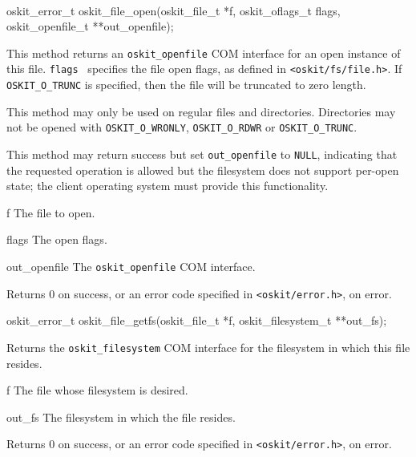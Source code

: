 \label{fs-file-open}
\begin{apisyn}
	\\

	\funcproto oskit_error_t
	oskit_file_open(oskit_file_t *f, 
	               oskit_oflags_t flags,
		       \outparam oskit_openfile_t **out_openfile);
\end{apisyn}
\ostofs
\begin{apidesc}
	This method returns an {\tt oskit_openfile} COM interface
	for an open instance of this file.
	{\tt flags } specifies the file open flags, as
	defined in {\tt <oskit/fs/file.h>}.  If {\tt OSKIT_O_TRUNC}
	is specified, then the file will be truncated
	to zero length. 

	This method may only be used on regular 	
	files and directories.   Directories
	may not be opened with {\tt OSKIT_O_WRONLY},
	{\tt OSKIT_O_RDWR} or {\tt OSKIT_O_TRUNC}.

	This method may return success but set
	{\tt *out_openfile} to {\tt NULL}, indicating that
	the requested operation is allowed but the
	filesystem does not support per-open state;
	the client operating system must provide this
	functionality.
\end{apidesc}
\begin{apiparm}
	\item[f]
		The file to open.
	\item[flags]
		The open flags.
	\item[out_openfile]	
		The {\tt oskit_openfile} COM interface.
\end{apiparm}
\begin{apiret}
	Returns 0 on success, or an error code specified in
	{\tt <oskit/error.h>}, on error.
\end{apiret}


\begin{apisyn}

	\funcproto oskit_error_t
	oskit_file_getfs(oskit_file_t *f, 
	                \outparam oskit_filesystem_t **out_fs);
\end{apisyn}
\ostofs
\begin{apidesc}
	Returns the {\tt oskit_filesystem} COM interface for
	the filesystem in which this file resides.
\end{apidesc}
\begin{apiparm}
	\item[f]
		The file whose filesystem is desired.
	\item[out_fs]
		The filesystem in which the file resides.
\end{apiparm}
\begin{apiret}
	Returns 0 on success, or an error code specified in
	{\tt <oskit/error.h>}, on error.
\end{apiret}


